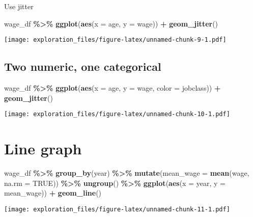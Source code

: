 \documentclass[
]{book}
\newenvironment{Shaded}{\begin{snugshade}}{\end{snugshade}}
\newcommand{\DataTypeTok}[1]{\textcolor[rgb]{0.13,0.29,0.53}{#1}}
\newcommand{\KeywordTok}[1]{\textcolor[rgb]{0.13,0.29,0.53}{\textbf{#1}}}
\newcommand{\NormalTok}[1]{#1}
\newcommand{\OperatorTok}[1]{\textcolor[rgb]{0.81,0.36,0.00}{\textbf{#1}}}
\newcommand{\OtherTok}[1]{\textcolor[rgb]{0.56,0.35,0.01}{#1}}
\newcommand{\StringTok}[1]{\textcolor[rgb]{0.31,0.60,0.02}{#1}}
\begin{document}
Use jitter

\begin{Shaded}
\begin{Highlighting}[]
\NormalTok{wage\_df }\OperatorTok{\%\textgreater{}\%}\StringTok{ }
\StringTok{  }\KeywordTok{ggplot}\NormalTok{(}\KeywordTok{aes}\NormalTok{(}\DataTypeTok{x =}\NormalTok{ age, }\DataTypeTok{y =}\NormalTok{ wage)) }\OperatorTok{+}
\StringTok{  }\KeywordTok{geom\_jitter}\NormalTok{()}
\end{Highlighting}
\end{Shaded}

\texttt{[image: exploration\_files/figure-latex/unnamed-chunk-9-1.pdf]}

\hypertarget{two-numeric-one-categorical}{%
\section{Two numeric, one categorical}\label{two-numeric-one-categorical}}

\begin{Shaded}
\begin{Highlighting}[]
\NormalTok{wage\_df }\OperatorTok{\%\textgreater{}\%}\StringTok{ }
\StringTok{  }\KeywordTok{ggplot}\NormalTok{(}\KeywordTok{aes}\NormalTok{(}\DataTypeTok{x =}\NormalTok{ age, }\DataTypeTok{y =}\NormalTok{ wage, }\DataTypeTok{color =}\NormalTok{ jobclass)) }\OperatorTok{+}
\StringTok{  }\KeywordTok{geom\_jitter}\NormalTok{()}
\end{Highlighting}
\end{Shaded}

\texttt{[image: exploration\_files/figure-latex/unnamed-chunk-10-1.pdf]}

\hypertarget{line}{%
\chapter{Line graph}\label{line}}

\begin{Shaded}
\begin{Highlighting}[]
\NormalTok{wage\_df }\OperatorTok{\%\textgreater{}\%}\StringTok{  }
\StringTok{  }\KeywordTok{group\_by}\NormalTok{(year) }\OperatorTok{\%\textgreater{}\%}\StringTok{  }
\StringTok{  }\KeywordTok{mutate}\NormalTok{(}\DataTypeTok{mean\_wage =} \KeywordTok{mean}\NormalTok{(wage, }\DataTypeTok{na.rm =} \OtherTok{TRUE}\NormalTok{)) }\OperatorTok{\%\textgreater{}\%}\StringTok{  }
\StringTok{  }\KeywordTok{ungroup}\NormalTok{() }\OperatorTok{\%\textgreater{}\%}\StringTok{ }
\StringTok{  }\KeywordTok{ggplot}\NormalTok{(}\KeywordTok{aes}\NormalTok{(}\DataTypeTok{x =}\NormalTok{ year, }\DataTypeTok{y =}\NormalTok{ mean\_wage)) }\OperatorTok{+}\StringTok{ }
\StringTok{  }\KeywordTok{geom\_line}\NormalTok{() }
\end{Highlighting}
\end{Shaded}

\texttt{[image: exploration\_files/figure-latex/unnamed-chunk-11-1.pdf]}

  
\end{document}
